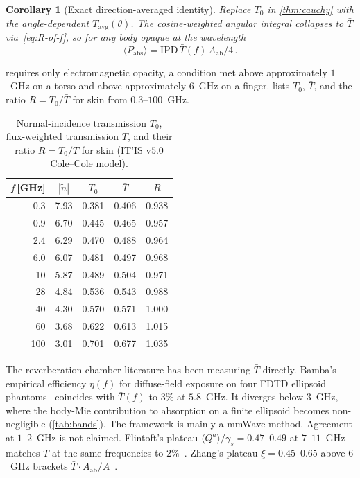 \documentclass[journal,twocolumn,10pt]{IEEEtran}
\theoremstyle{plain}
\newtheorem{corollary}[theorem]{Corollary}
\theoremstyle{remark}
\newcommand{\IPD}{\mathrm{IPD}}
\newcommand{\Aab}{A_{\mathrm{ab}}}
\newcommand{\Tavg}{T_{\mathrm{avg}}}
\newcommand{\Tbar}{\bar{T}}
\newcommand{\ntilde}{\tilde{n}}
\begin{document}
\begin{corollary}[Exact direction-averaged identity]\label{thm:exact}
Replace $T_0$ in \cref{thm:cauchy} with the angle-dependent
$\Tavg(\theta)$. The cosine-weighted angular integral collapses to
$\Tbar$ via~\eqref{eq:R-of-f}, so for any body opaque at the
wavelength
\begin{equation}\label{eq:cauchy-exact}
  \langle P_{\mathrm{abs}} \rangle = \IPD\,\Tbar(f)\,\Aab/4 \,.
\end{equation}
\end{corollary}

 requires only electromagnetic opacity, a
condition met above approximately $1$~GHz on a torso and above approximately $6$~GHz
on a finger.  lists $T_0$, $\Tbar$, and the ratio
$R = T_0/\Tbar$ for skin from $0.3$--$100$~GHz.

\begin{table}[!t]
\centering
\caption{Normal-incidence transmission $T_0$, flux-weighted
transmission $\Tbar$, and their ratio $R = T_0/\Tbar$ for skin
(IT'IS v$5.0$ Cole--Cole model).}\label{tab:Tbar}
\begin{tabular}{rcccc}
\toprule
$f$\,[GHz] & $|\ntilde|$ & $T_0$ & $\Tbar$ & $R$ \\
\midrule
0.3 & 7.93 & 0.381 & 0.406 & 0.938 \\
0.9 & 6.70 & 0.445 & 0.465 & 0.957 \\
2.4 & 6.29 & 0.470 & 0.488 & 0.964 \\
6.0 & 6.07 & 0.481 & 0.497 & 0.968 \\
10  & 5.87 & 0.489 & 0.504 & 0.971 \\
28  & 4.84 & 0.536 & 0.543 & 0.988 \\
40  & 4.30 & 0.570 & 0.571 & 1.000 \\
60  & 3.68 & 0.622 & 0.613 & 1.015 \\
100 & 3.01 & 0.701 & 0.677 & 1.035 \\
\bottomrule
\end{tabular}
\end{table}

The reverberation-chamber literature has been measuring $\Tbar$
directly. Bamba's empirical efficiency $\eta(f)$ for diffuse-field
exposure on four FDTD ellipsoid phantoms~\cite{Bamba2014}
coincides with $\Tbar(f)$ to $3\%$ at $5.8$~GHz. It diverges below
$3$~GHz, where the body-Mie contribution to absorption on a finite
ellipsoid becomes non-negligible (\cref{tab:bands}). The framework
is mainly a mmWave method. Agreement at $1$--$2$~GHz is not claimed.
Flintoft's plateau $\langle Q^a\rangle/\gamma_s = 0.47$--$0.49$
at $7$--$11$~GHz matches $\Tbar$ at the same frequencies to $2\%$~\cite{Flintoft2014}.
Zhang's plateau $\xi = 0.45$--$0.65$ above $6$~GHz brackets
$\Tbar\cdot\Aab/A$~\cite{Zhang2017thesis}.
\end{document}
